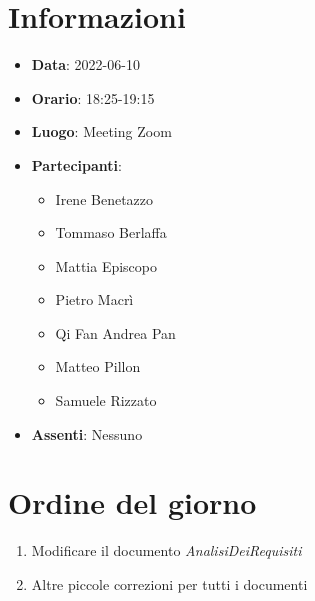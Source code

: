 \section{Informazioni}
	\begin{itemize}
		\item \textbf{Data}: 2022-06-10     %
		\item \textbf{Orario}: 18:25-19:15             %
		\item \textbf{Luogo}: Meeting Zoom
		\item \textbf{Partecipanti}:
		\begin{itemize}
			\item Irene Benetazzo
			\item Tommaso Berlaffa
			\item Mattia Episcopo
			\item Pietro Macrì
			\item Qi Fan Andrea Pan
			\item Matteo Pillon
			\item Samuele Rizzato
		\end{itemize}
        \item \textbf{Assenti}: Nessuno
	\end{itemize}
    
	\section{Ordine del giorno}
	\begin{enumerate}
		\item Modificare il documento \emph{AnalisiDeiRequisiti}
  		\item Altre piccole correzioni per tutti i documenti
	\end{enumerate}
	\newpage